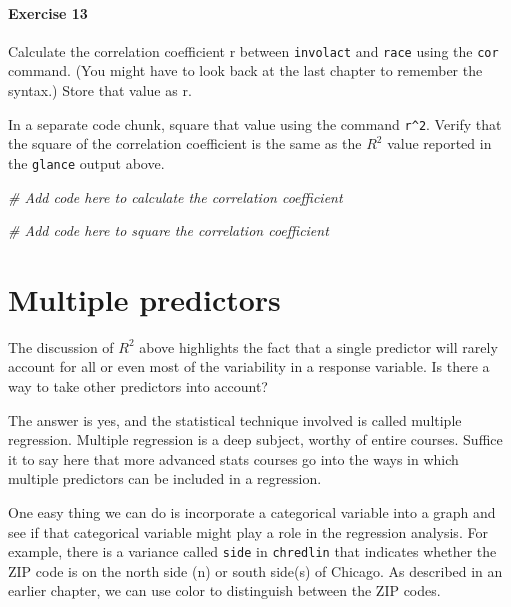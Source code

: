 \documentclass[
]{book}
\newenvironment{Shaded}{\begin{snugshade}}{\end{snugshade}}
\newcommand{\CommentTok}[1]{\textcolor[rgb]{0.56,0.35,0.01}{\textit{#1}}}
\begin{document}
\hypertarget{exercise-13-2}{%
\paragraph*{Exercise 13}\label{exercise-13-2}}

Calculate the correlation coefficient r between \texttt{involact} and \texttt{race} using the \texttt{cor} command. (You might have to look back at the last chapter to remember the syntax.) Store that value as r.

In a separate code chunk, square that value using the command \texttt{r\^{}2}. Verify that the square of the correlation coefficient is the same as the \(R^2\) value reported in the \texttt{glance} output above.

\begin{Shaded}
\begin{Highlighting}[]
\CommentTok{\# Add code here to calculate the correlation coefficient}
\end{Highlighting}
\end{Shaded}

\begin{Shaded}
\begin{Highlighting}[]
\CommentTok{\# Add code here to square the correlation coefficient}
\end{Highlighting}
\end{Shaded}

\hypertarget{regression-multiple}{%
\section{Multiple predictors}\label{regression-multiple}}

The discussion of \(R^2\) above highlights the fact that a single predictor will rarely account for all or even most of the variability in a response variable. Is there a way to take other predictors into account?

The answer is yes, and the statistical technique involved is called multiple regression. Multiple regression is a deep subject, worthy of entire courses. Suffice it to say here that more advanced stats courses go into the ways in which multiple predictors can be included in a regression.

One easy thing we can do is incorporate a categorical variable into a graph and see if that categorical variable might play a role in the regression analysis. For example, there is a variance called \texttt{side} in \texttt{chredlin} that indicates whether the ZIP code is on the north side (n) or south side(s) of Chicago. As described in an earlier chapter, we can use color to distinguish between the ZIP codes.
\end{document}
